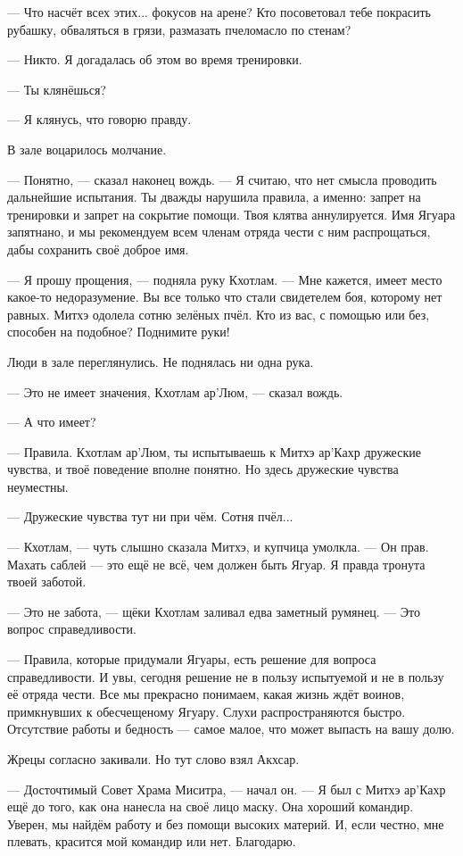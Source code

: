 --- Что насчёт всех этих... фокусов на арене?
Кто посоветовал тебе покрасить рубашку, обваляться в грязи, размазать пчеломасло по стенам?

--- Никто.
Я догадалась об этом во время тренировки.

--- Ты клянёшься?

--- Я клянусь, что говорю правду.

В зале воцарилось молчание.

--- Понятно, --- сказал наконец вождь.
--- Я считаю, что нет смысла проводить дальнейшие испытания.
Ты дважды нарушила правила, а именно: запрет на тренировки и запрет на сокрытие помощи.
Твоя клятва аннулируется.
Имя Ягуара запятнано, и мы рекомендуем всем членам отряда чести с ним распрощаться, дабы сохранить своё доброе имя.

--- Я прошу прощения, --- подняла руку Кхотлам.
--- Мне кажется, имеет место какое-то недоразумение.
Вы все только что стали свидетелем боя, которому нет равных.
Митхэ одолела сотню зелёных пчёл.
Кто из вас, с помощью или без, способен на подобное?
Поднимите руки!

Люди в зале переглянулись.
Не поднялась ни одна рука.

--- Это не имеет значения, Кхотлам ар'Люм, --- сказал вождь.

--- А что имеет?

--- Правила.
Кхотлам ар'Люм, ты испытываешь к Митхэ ар'Кахр дружеские чувства, и твоё поведение вполне понятно.
Но здесь дружеские чувства неуместны.

--- Дружеские чувства тут ни при чём.
Сотня пчёл...

--- Кхотлам, --- чуть слышно сказала Митхэ, и купчица умолкла.
--- Он прав.
Махать саблей --- это ещё не всё, чем должен быть Ягуар.
Я правда тронута твоей заботой.

--- Это не забота, --- щёки Кхотлам заливал едва заметный румянец.
--- Это вопрос справедливости.

--- Правила, которые придумали Ягуары, есть решение для вопроса справедливости.
И увы, сегодня решение не в пользу испытуемой и не в пользу её отряда чести.
Все мы прекрасно понимаем, какая жизнь ждёт воинов, примкнувших к обесчещеному Ягуару.
Слухи распространяются быстро.
Отсутствие работы и бедность --- самое малое, что может выпасть на вашу долю.

Жрецы согласно закивали.
Но тут слово взял Акхсар.

--- Досточтимый Совет Храма Миситра, --- начал он.
--- Я был с Митхэ ар'Кахр ещё до того, как она нанесла на своё лицо маску.
Она хороший командир.
Уверен, мы найдём работу и без помощи высоких материй.
И, если честно, мне плевать, красится мой командир или нет.
Благодарю.

